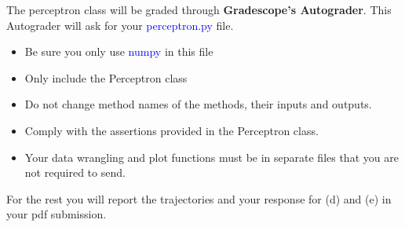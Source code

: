 The perceptron class will be graded through \textbf{Gradescope's Autograder}. This Autograder will ask for your \textcolor{blue}{perceptron.py} file.
\begin{itemize}
    \item Be sure you only use \textcolor{blue}{numpy} in this file
    \item Only include the Perceptron class
    \item Do not change method names of the methods, their inputs and outputs.
    \item Comply with the assertions provided in the Perceptron class.
    \item Your data wrangling and plot functions must be in separate files that you are not required to send.
\end{itemize}
For the rest you will report the trajectories and your response for (d) and (e) in your pdf submission.